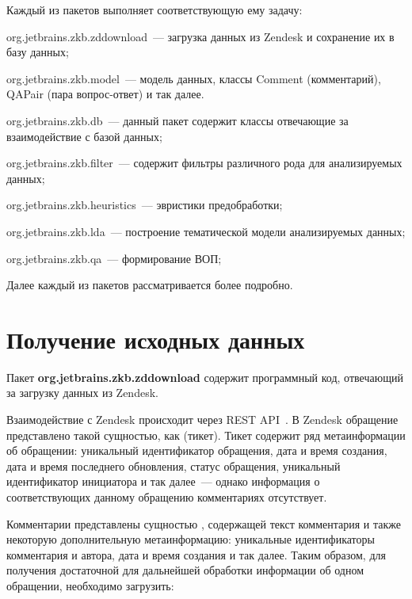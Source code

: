 Каждый из пакетов выполняет соответствующую ему задачу:

\begin{itemize*}
\item org.jetbrains.zkb.zddownload~--- загрузка данных из Zendesk и сохранение их в базу данных;
\item org.jetbrains.zkb.model~--- модель данных, классы Comment (комментарий), QAPair (пара вопрос-ответ) и так далее.
\item org.jetbrains.zkb.db~--- данный пакет содержит классы отвечающие за взаимодействие с базой данных;
\item org.jetbrains.zkb.filter~--- содержит фильтры различного рода для анализируемых данных;
\item org.jetbrains.zkb.heuristics~--- эвристики предобработки;
\item org.jetbrains.zkb.lda~--- построение тематической модели анализируемых данных;
\item org.jetbrains.zkb.qa~--- формирование ВОП;

\end{itemize*}

Далее каждый из пакетов рассматривается более подробно.

\section{Получение исходных данных}
\label{sec:zddwn}

Пакет \textbf{org.jetbrains.zkb.zddownload} содержит программный код, отвечающий за загрузку данных из Zendesk.

Взаимодействие с Zendesk происходит через REST API~\cite{zdapi}. В Zendesk обращение представлено такой сущностью, как  (тикет). Тикет содержит ряд метаинформации об обращении: уникальный идентификатор обращения, дата и время создания, дата и время последнего обновления, статус обращения, уникальный идентификатор инициатора и так далее~--- однако информация о соответствующих данному обращению комментариях отсутствует.


Комментарии представлены сущностью , содержащей текст комментария и также некоторую дополнительную метаинформацию: уникальные идентификаторы комментария и автора, дата и время создания и так далее. Таким образом, для получения достаточной для дальнейшей обработки информации об одном обращении, необходимо загрузить:

